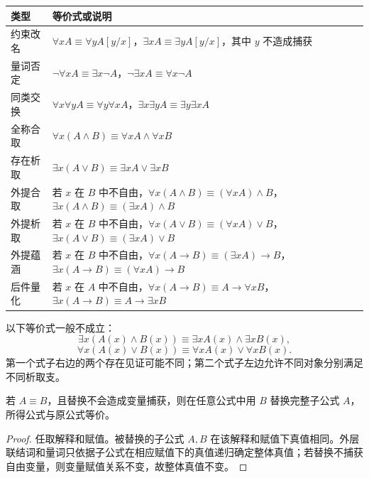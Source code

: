 \begin{center}\small
\begin{tabularx}{\textwidth}{lX}
\toprule
类型 & 等价式或说明\\
\midrule
约束改名 & $\forall xA\equiv\forall yA[y/x]$，$\exists xA\equiv\exists yA[y/x]$，其中 $y$ 不造成捕获\\
量词否定 & $\neg\forall xA\equiv\exists x\neg A$，$\neg\exists xA\equiv\forall x\neg A$\\
同类交换 & $\forall x\forall yA\equiv\forall y\forall xA$，$\exists x\exists yA\equiv\exists y\exists xA$\\
全称合取 & $\forall x(A\land B)\equiv\forall xA\land\forall xB$\\
存在析取 & $\exists x(A\lor B)\equiv\exists xA\lor\exists xB$\\
外提合取 & 若 $x$ 在 $B$ 中不自由，$\forall x(A\land B)\equiv(\forall xA)\land B$，$\exists x(A\land B)\equiv(\exists xA)\land B$\\
外提析取 & 若 $x$ 在 $B$ 中不自由，$\forall x(A\lor B)\equiv(\forall xA)\lor B$，$\exists x(A\lor B)\equiv(\exists xA)\lor B$\\
外提蕴涵 & 若 $x$ 在 $B$ 中不自由，$\forall x(A\to B)\equiv(\exists xA)\to B$，$\exists x(A\to B)\equiv(\forall xA)\to B$\\
后件量化 & 若 $x$ 在 $A$ 中不自由，$\forall x(A\to B)\equiv A\to\forall xB$，$\exists x(A\to B)\equiv A\to\exists xB$\\
\bottomrule
\end{tabularx}
\end{center}

\begin{pitfall}[不能拆开的量词公式]\label{ch2-bad-distribution}
以下等价式一般不成立：
\[
\exists x(A(x)\land B(x))\equiv \exists xA(x)\land\exists xB(x),
\]
\[
\forall x(A(x)\lor B(x))\equiv \forall xA(x)\lor\forall xB(x).
\]
第一个式子右边的两个存在见证可能不同；第二个式子左边允许不同对象分别满足不同析取支。
\end{pitfall}

\begin{theorem}[谓词等价替换]\label{ch2-replacement}
若 $A\equiv B$，且替换不会造成变量捕获，则在任意公式中用 $B$ 替换完整子公式 $A$，所得公式与原公式等价。
\end{theorem}
\begin{proof}
任取解释和赋值。被替换的子公式 $A,B$ 在该解释和赋值下真值相同。外层联结词和量词只依据子公式在相应赋值下的真值递归确定整体真值；若替换不捕获自由变量，则变量赋值关系不变，故整体真值不变。
\end{proof}

